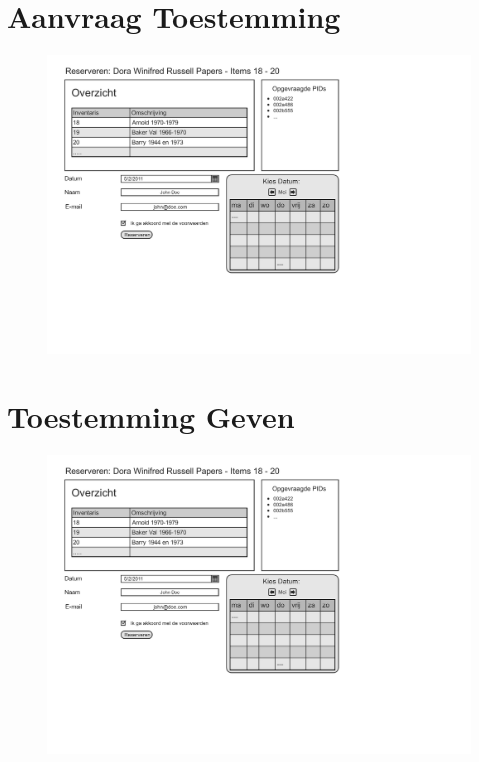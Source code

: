 \documentclass[a4paper,titlepage]{report}
\makeatletter
\def\namedlabel#1#2{
  \label{#1}
  \begingroup
   \def\@currentlabel{#2}%
   \label{#1:name}\endgroup
}
\makeatother
\begin{document}
\section{Aanvraag Toestemming}
\namedlabel{ui:aanvraag-toestemming}{Aanvraag Toestemming}
\begin{figure}[H]
  \includegraphics[totalheight=150mm,angle=90,page=6]{ui.pdf}
\end{figure}

\section{Toestemming Geven}
\namedlabel{ui:toestemming-geven}{Toestemming Geven}
\begin{figure}[H]
  \includegraphics[totalheight=150mm,angle=90,page=7]{ui.pdf}
\end{figure}
\end{document}
